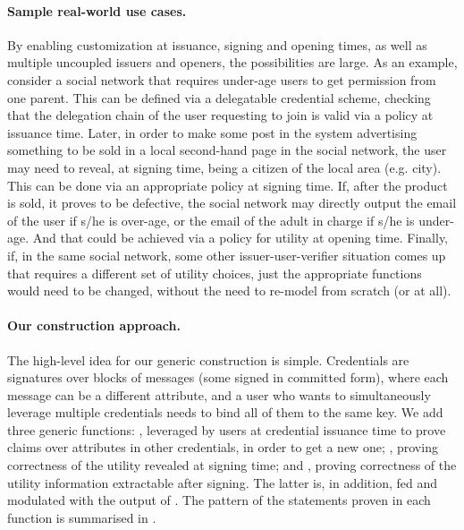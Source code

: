\paragraph{Sample real-world use cases.} %
By enabling customization at issuance, signing and opening times, as well as
multiple uncoupled issuers and openers, the
possibilities are large. As an example, consider a social network that requires
under-age users to get permission from one parent. This can be defined via a
delegatable credential scheme, checking that the delegation chain of the user
requesting to join is valid via a policy at issuance time. Later, in order to
make some post in the system advertising something to be sold in a local
second-hand page in the social network, the user may need to reveal, at signing
time, being a citizen of the local area (e.g. city). This can be done via an
appropriate policy at signing time. If, after the product is sold, it proves
to be defective, the social network may directly output the email of the user
if s/he is over-age, or the email of the adult in charge if s/he is under-age.
And that could be achieved via a policy for utility at opening time. Finally,
if, in the same social network, some other
issuer-user-verifier situation comes up that requires a different set of utility
choices, just the appropriate functions would need to be changed, without the
need to re-model from scratch (or at all).

\paragraph{Our construction approach.} %
The high-level idea for our generic construction \CUASGen is simple. Credentials
are signatures over blocks of messages (some signed in committed form), where
each message can be a different attribute, and a user who wants to
simultaneously leverage multiple credentials needs to bind all of them to the
same key. We add three generic functions: \fissue, leveraged by users at
credential issuance time to prove claims over attributes in other credentials,
in order to get a new one; \feval, proving correctness of the utility revealed
at signing time; and \finsp, proving correctness of the utility information
extractable after signing. The latter is, in addition, fed and modulated with
the output of \feval. The pattern of the statements proven in each function is
summarised in .


